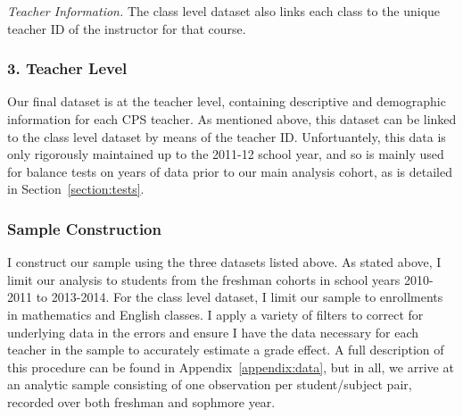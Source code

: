 \documentclass[../thesis_main.tex]{subfiles}
\begin{document}
\textit{Teacher Information.} The class level dataset also links each class to the unique teacher ID of the instructor for that course. 

\subsubsection{3. Teacher Level} 

Our final dataset is at the teacher level, containing descriptive and demographic information for each CPS teacher. As mentioned above, this dataset can be linked to the class level dataset by means of the teacher ID. Unfortuantely, this data is only rigorously maintained up to the 2011-12 school year, and so is mainly used for balance tests on years of data prior to our main analysis cohort, as is detailed in Section~\ref{section:tests}.


\subsubsection{Sample Construction}

I construct our sample using the three datasets listed above. As stated above, I  limit our analysis to students from the freshman cohorts in school years 2010-2011 to 2013-2014. For the class level dataset, I  limit our sample to enrollments in mathematics and English classes. I apply a variety of filters to correct for underlying data in the errors and ensure I  have the data necessary for each teacher in the sample to accurately estimate a grade effect. A full description of this procedure can be found in Appendix~\ref{appendix:data}, but in all, we arrive at an analytic sample consisting of one observation per student/subject pair, recorded over both freshman and sophmore year. 


\end{document}
